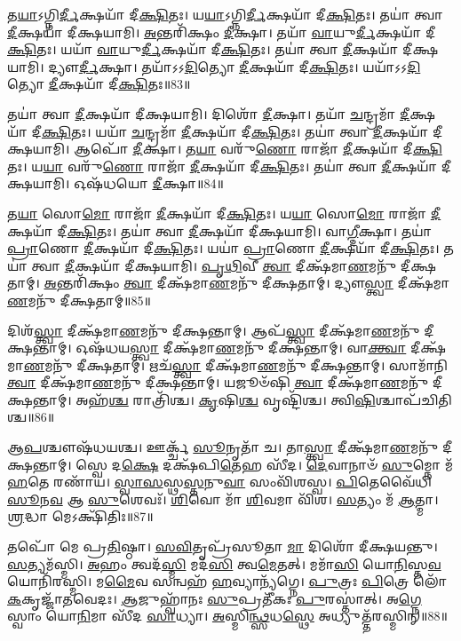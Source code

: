 𑌤\-\ul{𑌯𑌾}\-𑌽𑌗𑍍𑌨𑌿\-\ul{𑌰𑍍𑌦𑍀}\-𑌕𑍍𑌷𑌯𑌾᳴ 𑌦𑍀\-\ul{𑌕𑍍𑌷𑌿}\-𑌤𑌃।
𑌯\-\ul{𑌯𑌾}\-𑌽𑌗𑍍𑌨𑌿\-\ul{𑌰𑍍𑌦𑍀}\-𑌕𑍍𑌷𑌯𑌾᳴ 𑌦𑍀\-\ul{𑌕𑍍𑌷𑌿}\-𑌤𑌃।
𑌤𑌯𑌾॑ 𑌤𑍍𑌵𑌾 \ul{𑌦𑍀}\-𑌕𑍍𑌷𑌯𑌾᳴ 𑌦𑍀𑌕𑍍𑌷𑌯𑌾𑌮𑌿।
\-\ul{𑌅}\-𑌨𑍍𑌤𑌰𑌿᳴𑌕𑍍𑌷𑌂 \ul{𑌦𑍀}\-𑌕𑍍𑌷𑌾।
𑌤𑌯𑌾᳴ \ul{𑌵𑌾}\-𑌯𑍁\-\ul{𑌰𑍍𑌦𑍀}\-𑌕𑍍𑌷𑌯𑌾᳴ 𑌦𑍀\-\ul{𑌕𑍍𑌷𑌿}\-𑌤𑌃।
𑌯𑌯𑌾᳴ \ul{𑌵𑌾}\-𑌯𑍁\-\ul{𑌰𑍍𑌦𑍀}\-𑌕𑍍𑌷𑌯𑌾᳴ 𑌦𑍀\-\ul{𑌕𑍍𑌷𑌿}\-𑌤𑌃।
𑌤𑌯𑌾॑ 𑌤𑍍𑌵𑌾 \ul{𑌦𑍀}\-𑌕𑍍𑌷𑌯𑌾᳴ 𑌦𑍀𑌕𑍍𑌷𑌯𑌾𑌮𑌿।
𑌦𑍍𑌯𑍗\-\ul{𑌰𑍍𑌦𑍀}\-𑌕𑍍𑌷𑌾।
𑌤𑌯𑌾᳴𑌽𑌽\-\ul{𑌦𑌿}\-𑌤𑍍𑌯𑍋 \ul{𑌦𑍀}\-𑌕𑍍𑌷𑌯𑌾᳴ 𑌦𑍀\-\ul{𑌕𑍍𑌷𑌿}\-𑌤𑌃।
𑌯𑌯𑌾᳴𑌽𑌽\-\ul{𑌦𑌿}\-𑌤𑍍𑌯𑍋 \ul{𑌦𑍀}\-𑌕𑍍𑌷𑌯𑌾᳴ 𑌦𑍀\-\ul{𑌕𑍍𑌷𑌿}\-𑌤𑌃॥83॥

𑌤𑌯𑌾॑ 𑌤𑍍𑌵𑌾 \ul{𑌦𑍀}\-𑌕𑍍𑌷𑌯𑌾᳴ 𑌦𑍀𑌕𑍍𑌷𑌯𑌾𑌮𑌿।
𑌦𑌿𑌶𑍋᳴ \ul{𑌦𑍀}\-𑌕𑍍𑌷𑌾।
𑌤𑌯𑌾᳴ \ul{𑌚}\-𑌨𑍍𑌦𑍍𑌰𑌮𑌾᳴ \ul{𑌦𑍀}\-𑌕𑍍𑌷𑌯𑌾᳴ 𑌦𑍀\-\ul{𑌕𑍍𑌷𑌿}\-𑌤𑌃।
𑌯𑌯𑌾᳴ \ul{𑌚}\-𑌨𑍍𑌦𑍍𑌰𑌮𑌾᳴ \ul{𑌦𑍀}\-𑌕𑍍𑌷𑌯𑌾᳴ 𑌦𑍀\-\ul{𑌕𑍍𑌷𑌿}\-𑌤𑌃।
𑌤𑌯𑌾॑ 𑌤𑍍𑌵𑌾 \ul{𑌦𑍀}\-𑌕𑍍𑌷𑌯𑌾᳴ 𑌦𑍀𑌕𑍍𑌷𑌯𑌾𑌮𑌿।
𑌆𑌪𑍋᳴ \ul{𑌦𑍀}\-𑌕𑍍𑌷𑌾।
𑌤\-\ul{𑌯𑌾} 𑌵𑌰𑍁᳴\-\ul{𑌣𑍋} 𑌰𑌾𑌜𑌾᳴ \ul{𑌦𑍀}\-𑌕𑍍𑌷𑌯𑌾᳴ 𑌦𑍀\-\ul{𑌕𑍍𑌷𑌿}\-𑌤𑌃।
𑌯\-\ul{𑌯𑌾} 𑌵𑌰𑍁᳴\-\ul{𑌣𑍋} 𑌰𑌾𑌜𑌾᳴ \ul{𑌦𑍀}\-𑌕𑍍𑌷𑌯𑌾᳴ 𑌦𑍀\-\ul{𑌕𑍍𑌷𑌿}\-𑌤𑌃।
𑌤𑌯𑌾॑ 𑌤𑍍𑌵𑌾 \ul{𑌦𑍀}\-𑌕𑍍𑌷𑌯𑌾᳴ 𑌦𑍀𑌕𑍍𑌷𑌯𑌾𑌮𑌿।
𑌓𑌷᳴𑌧𑌯𑍋 \ul{𑌦𑍀}\-𑌕𑍍𑌷𑌾॥84॥

𑌤\-\ul{𑌯𑌾} 𑌸𑍋\-\ul{𑌮𑍋} 𑌰𑌾𑌜𑌾᳴ \ul{𑌦𑍀}\-𑌕𑍍𑌷𑌯𑌾᳴ 𑌦𑍀\-\ul{𑌕𑍍𑌷𑌿}\-𑌤𑌃।
𑌯\-\ul{𑌯𑌾} 𑌸𑍋\-\ul{𑌮𑍋} 𑌰𑌾𑌜𑌾᳴ \ul{𑌦𑍀}\-𑌕𑍍𑌷𑌯𑌾᳴ 𑌦𑍀\-\ul{𑌕𑍍𑌷𑌿}\-𑌤𑌃।
𑌤𑌯𑌾॑ 𑌤𑍍𑌵𑌾 \ul{𑌦𑍀}\-𑌕𑍍𑌷𑌯𑌾᳴ 𑌦𑍀𑌕𑍍𑌷𑌯𑌾𑌮𑌿।
𑌵𑌾\-\ul{𑌗𑍍𑌦𑍀}\-𑌕𑍍𑌷𑌾।
𑌤𑌯𑌾॑ \ul{𑌪𑍍𑌰𑌾}\-𑌣𑍋 \ul{𑌦𑍀}\-𑌕𑍍𑌷𑌯𑌾᳴ 𑌦𑍀\-\ul{𑌕𑍍𑌷𑌿}\-𑌤𑌃।
𑌯𑌯𑌾॑ \ul{𑌪𑍍𑌰𑌾}\-𑌣𑍋 \ul{𑌦𑍀}\-𑌕𑍍𑌷𑌯𑌾᳴ 𑌦𑍀\-\ul{𑌕𑍍𑌷𑌿}\-𑌤𑌃।
𑌤𑌯𑌾॑ 𑌤𑍍𑌵𑌾 \ul{𑌦𑍀}\-𑌕𑍍𑌷𑌯𑌾᳴ 𑌦𑍀𑌕𑍍𑌷𑌯𑌾𑌮𑌿।
\-\ul{𑌪𑍃}\-\-\ul{𑌥𑌿}\-𑌵𑍀 \ul{𑌤𑍍𑌵𑌾} 𑌦𑍀𑌕𑍍𑌷᳴𑌮𑌾\-\ul{𑌣}\-𑌮𑌨𑍁᳴ 𑌦𑍀𑌕𑍍𑌷𑌤𑌾𑌮𑍍।
\-\ul{𑌅}\-𑌨𑍍𑌤𑌰𑌿᳴𑌕𑍍𑌷𑌂 \ul{𑌤𑍍𑌵𑌾} 𑌦𑍀𑌕𑍍𑌷᳴𑌮𑌾\-\ul{𑌣}\-𑌮𑌨𑍁᳴ 𑌦𑍀𑌕𑍍𑌷𑌤𑌾𑌮𑍍।
𑌦𑍍𑌯𑍗\-\ul{𑌸𑍍𑌤𑍍𑌵𑌾} 𑌦𑍀𑌕𑍍𑌷᳴𑌮𑌾\-\ul{𑌣}\-𑌮𑌨𑍁᳴ 𑌦𑍀𑌕𑍍𑌷𑌤𑌾𑌮𑍍॥85॥

𑌦𑌿𑌶᳴\-\ul{𑌸𑍍𑌤𑍍𑌵𑌾} 𑌦𑍀𑌕𑍍𑌷᳴𑌮𑌾\-\ul{𑌣}\-𑌮𑌨𑍁᳴ 𑌦𑍀𑌕𑍍𑌷𑌨𑍍𑌤𑌾𑌮𑍍।
𑌆𑌪᳴\-\ul{𑌸𑍍𑌤𑍍𑌵𑌾} 𑌦𑍀𑌕𑍍𑌷᳴𑌮𑌾\-\ul{𑌣}\-𑌮𑌨𑍁᳴ 𑌦𑍀𑌕𑍍𑌷𑌨𑍍𑌤𑌾𑌮𑍍।
𑌓𑌷᳴𑌧𑌯\-\ul{𑌸𑍍𑌤𑍍𑌵𑌾} 𑌦𑍀𑌕𑍍𑌷᳴𑌮𑌾\-\ul{𑌣}\-𑌮𑌨𑍁᳴ 𑌦𑍀𑌕𑍍𑌷𑌨𑍍𑌤𑌾𑌮𑍍।
𑌵𑌾\-\ul{𑌕𑍍𑌤𑍍𑌵𑌾} 𑌦𑍀𑌕𑍍𑌷᳴𑌮𑌾\-\ul{𑌣}\-𑌮𑌨𑍁᳴ 𑌦𑍀𑌕𑍍𑌷𑌤𑌾𑌮𑍍।
𑌋𑌚᳴\-\ul{𑌸𑍍𑌤𑍍𑌵𑌾} 𑌦𑍀𑌕𑍍𑌷᳴𑌮𑌾\-\ul{𑌣}\-𑌮𑌨𑍁᳴ 𑌦𑍀𑌕𑍍𑌷𑌨𑍍𑌤𑌾𑌮𑍍।
𑌸𑌾𑌮𑌾᳴𑌨𑌿 \ul{𑌤𑍍𑌵𑌾} 𑌦𑍀𑌕𑍍𑌷᳴𑌮𑌾\-\ul{𑌣}\-𑌮𑌨𑍁᳴ 𑌦𑍀𑌕𑍍𑌷𑌨𑍍𑌤𑌾𑌮𑍍।
𑌯𑌜𑍂𑍞᳴𑌷𑌿 \ul{𑌤𑍍𑌵𑌾} 𑌦𑍀𑌕𑍍𑌷᳴𑌮𑌾\-\ul{𑌣}\-𑌮𑌨𑍁᳴ 𑌦𑍀𑌕𑍍𑌷𑌨𑍍𑌤𑌾𑌮𑍍।
𑌅𑌹᳴\-\ul{𑌶𑍍𑌚} 𑌰𑌾𑌤𑍍𑌰𑌿᳴𑌶𑍍𑌚।
\-\ul{𑌕𑍃}\-𑌷𑌿\-\ul{𑌶𑍍𑌚} 𑌵𑍃𑌷𑍍𑌟𑌿᳴𑌶𑍍𑌚।
𑌤𑍍𑌵𑌿\-\ul{𑌷𑌿}\-𑌶𑍍𑌚𑌾𑌪᳴𑌚𑌿𑌤𑌿𑌶𑍍𑌚॥86॥

𑌆\-\ul{𑌪}\-𑌶𑍍𑌚𑍗𑌷᳴𑌧𑌯𑌶𑍍𑌚।
𑌊𑌰𑍍𑌕𑍍𑌚᳴ \ul{𑌸𑍂}\-𑌨𑍃𑌤𑌾᳴ 𑌚।
𑌤𑌾\-\ul{𑌸𑍍𑌤𑍍𑌵𑌾} 𑌦𑍀𑌕𑍍𑌷᳴𑌮𑌾\-\ul{𑌣}\-𑌮𑌨𑍁᳴ 𑌦𑍀𑌕𑍍𑌷𑌨𑍍𑌤𑌾𑌮𑍍।
𑌸𑍍𑌵𑍇 𑌦\-\ul{𑌕𑍍𑌷𑍇} 𑌦𑌕𑍍𑌷᳴𑌪𑌿\-\ul{𑌤𑍇}\-𑌹 𑌸𑍀᳴𑌦।
\-\ul{𑌦𑍇}\-𑌵𑌾𑌨𑌾𑍞᳴ \ul{𑌸𑍁}\-𑌮𑍍𑌨𑍋 𑌮᳴\-\ul{𑌹}\-𑌤𑍇 𑌰𑌣𑌾᳴𑌯।
\-\ul{𑌸𑍍𑌵𑌾}\-\-\ul{𑌸}\-𑌸𑍍𑌥\-\ul{𑌸𑍍𑌤}\-𑌨𑍁\-\ul{𑌵𑌾} 𑌸𑌂𑌵𑌿᳴𑌶𑌸𑍍𑌵।
\-\ul{𑌪𑌿}\-𑌤𑍇𑌵𑍈᳴𑌧𑌿 \ul{𑌸𑍂}\-𑌨\-\ul{𑌵} 𑌆 \ul{𑌸𑍁}\-𑌶𑍇𑌵𑌃᳴।
\-\ul{𑌶𑌿}\-𑌵𑍋 𑌮𑌾᳴ \ul{𑌶𑌿}\-𑌵𑌮𑌾 𑌵𑌿᳴𑌶।
\-\ul{𑌸}\-𑌤𑍍𑌯𑌂 𑌮᳴ \ul{𑌆}\-𑌤𑍍𑌮𑌾।
\-\ul{𑌶𑍍𑌰}\-𑌦𑍍𑌧𑌾 𑌮𑍇𑌽𑌕𑍍𑌷𑌿᳴𑌤𑌿𑌃॥87॥

𑌤𑌪𑍋᳴ 𑌮𑍇 𑌪𑍍𑌰\-\ul{𑌤𑌿}\-𑌷𑍍𑌠𑌾।
\-\ul{𑌸}\-\-\ul{𑌵𑌿}\-𑌤𑍃𑌪𑍍𑌰᳴𑌸𑍂𑌤𑌾 \ul{𑌮𑌾} 𑌦𑌿𑌶𑍋᳴ 𑌦𑍀𑌕𑍍𑌷𑌯𑌨𑍍𑌤𑍁।
\-\ul{𑌸}\-𑌤𑍍𑌯𑌮᳴𑌸𑍍𑌮𑌿।
\-\ul{𑌅}\-𑌹𑌂 𑌤𑍍𑌵𑌦᳴\-\ul{𑌸𑍍𑌮𑌿} 𑌮𑌦᳴\-\ul{𑌸𑌿} 𑌤𑍍𑌵\-\ul{𑌮𑍇}\-𑌤𑌤𑍍।
𑌮𑌮𑌾᳴\-\ul{𑌸𑌿} 𑌯𑍋\-\ul{𑌨𑌿}\-𑌸𑍍𑌤\-\ul{𑌵} 𑌯𑍋𑌨𑌿᳴𑌰𑌸𑍍𑌮𑌿।
𑌮\-\ul{𑌮𑍈}\-𑌵 𑌸𑌨𑍍𑌵𑌹᳴ \ul{𑌹}\-𑌵𑍍𑌯𑌾𑌨𑍍𑌯᳴𑌗𑍍𑌨𑍇।
\-\ul{𑌪𑍁}\-𑌤𑍍𑌰𑌃 \ul{𑌪𑌿}\-𑌤𑍍𑌰𑍇 𑌲𑍋᳴\-\ul{𑌕}\-𑌕𑍃𑌜𑍍𑌜𑌾᳴𑌤𑌵𑍇𑌦𑌃।
\-\ul{𑌆}\-𑌜𑍁𑌹𑍍𑌵𑌾᳴𑌨𑌃 \ul{𑌸𑍁}\-𑌪𑍍𑌰𑌤𑍀᳴𑌕𑌃 \ul{𑌪𑍁}\-𑌰𑌸𑍍𑌤𑌾॑𑌤𑍍।
𑌅\-\ul{𑌗𑍍𑌨𑍇} 𑌸𑍍𑌵𑌾𑌂 𑌯𑍋\-\ul{𑌨𑌿}\-𑌮𑌾 𑌸𑍀᳴𑌦 \ul{𑌸𑌾}\-𑌧𑍍𑌯𑌾।
\-\ul{𑌅}\-𑌸𑍍𑌮𑌿\-\ul{𑌨𑍍𑌥𑍍𑌸}\-𑌧\-\ul{𑌸𑍍𑌥𑍇} 𑌅𑌧𑍍𑌯𑍁𑌤𑍍𑌤᳴𑌰𑌸𑍍𑌮𑌿𑌨𑍍॥88॥

